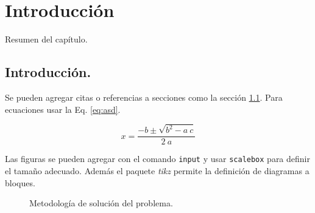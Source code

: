 \chapter{Introducción}
\label{ch:intro}
Resumen del capítulo.

\section{Introducción.}
	\label{sec:intro}
	Se pueden agregar citas \cite{vampiro} o referencias a secciones como la sección \ref{sec:intro}. Para ecuaciones usar la Eq. \eqref{eq:asd}.

	\begin{equation}
		x = \frac{-b \pm \sqrt{b^2 - a\ c}}{2\ a}
		\label{eq:asd}
	\end{equation}


	Las figuras se pueden agregar con el comando \texttt{input} y usar \texttt{scalebox} para definir el tamaño adecuado. Además el paquete \textit{tikz} permite la definición de diagramas a bloques.

	\begin{figure}[!hbt]
		\centering
		\scalebox{0.88}{}
		\caption{Metodología de solución del problema.}
		\label{fig:metod}
	\end{figure}




